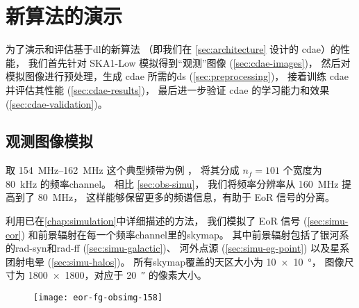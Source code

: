 \section{新算法的演示}
\label{sec:cdae-demo}

为了演示和评估基于\ac{dl}的新算法
（即我们在 \autoref{sec:architecture} 设计的 \ac{cdae}）的性能，
我们首先针对 SKA1-Low 模拟得到\enquote{观测}图像 (\autoref{sec:cdae-images})，
然后对模拟图像进行预处理，生成 \ac{cdae} 所需的\ac{ds} (\autoref{sec:preprocessing})，
接着训练 \ac{cdae} 并评估其性能 (\autoref{sec:cdae-results})，
最后进一步验证 \ac{cdae} 的学习能力和效果 (\autoref{sec:cdae-validation})。

\subsection{观测图像模拟}
\label{sec:cdae-images}

取 \SIrange{154}{162}{\MHz} 这个典型频带为例 \cite{datta2010}，
将其分成 $n_f = 101$ 个宽度为 \SI{80}{\kHz} 的频率\ac{channel}。
相比 \autoref{sec:obs-simu}，
我们将频率分辨率从 \SI{160}{\MHz} 提高到了 \SI{80}{\MHz}，
这样能够保留更多的频谱信息，有助于 EoR 信号的分离。

利用已在\autoref{chap:simulation}中详细描述的方法，
我们模拟了 EoR 信号 (\autoref{sec:simu-eor})
和前景辐射在每一个频率\ac{channel}里的\ac{skymap}。
其中前景辐射包括了银河系的\ac{rad-syn}和\ac{rad-ff} (\autoref{sec:simu-galactic})、
河外点源 (\autoref{sec:simu-eg-point})
以及星系团射电晕 (\autoref{sec:simu-halos})。
所有\ac{skymap}覆盖的天区大小为 \SI{10 x 10}{\degree}，
图像尺寸为 \num{1800 x 1800}，对应于 \SI{20}{\arcsecond} 的像素大小。

\begin{figure}[htp]
  \centering
  \texttt{[image: eor-fg-obsimg-158]}
  \label{fig:eor-fg-obsimg}
\end{figure}

